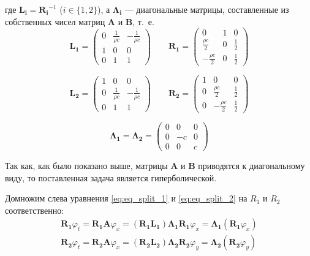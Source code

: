 \documentclass[12pt,a4paper]{article}
\begin{document}
где $\bm{L_i} = \bm{R_i}^{-1}$ ($i\in\{1,2\}$), а $\bm{\Lambda_i}$ --- диагональные матрицы, составленные из собственных чисел матриц $\bm{A}$ и $\bm{B}$, т.~е.
\begin{equation}
	\bm{L_1} = \begin{pmatrix}
				0 & \frac{1}{\rho c} & -\frac{1}{\rho c} \\
				1 & 0 & 0 \\
				0 & 1 & 1			
		 	 \end{pmatrix} \qquad
	\bm{R_1} = \begin{pmatrix}
				0 & 1 & 0 \\
				\frac{\rho c}{2} & 0 & \frac{1}{2} \\
				-\frac{\rho c}{2} & 0 & \frac{1}{2}		
		 	 \end{pmatrix}
\end{equation}

\begin{equation}
	\bm{L_2} = \begin{pmatrix}
				1 & 0 & 0 \\
				0 & \frac{1}{\rho c} & -\frac{1}{\rho c} \\
				0 & 1 & 1			
		 	 \end{pmatrix} \qquad
	\bm{R_2} = \begin{pmatrix}
				1 & 0 & 0 \\
				0 & \frac{\rho c}{2} & \frac{1}{2} \\
				0 & -\frac{\rho c}{2} & \frac{1}{2}		
		 	 \end{pmatrix}
\end{equation}

\begin{equation}
	\bm{\Lambda_1} = \bm{\Lambda_2} = \begin{pmatrix}
								0 & 0 & 0 \\
								0 & -c & 0 \\
								0 & 0 & c				
							\end{pmatrix}
\end{equation}

Так как, как было показано выше, матрицы $\bm{A}$ и $\bm{B}$ приводятся к диагональному виду, то поставленная задача является гиперболической.

Домножим слева уравнения \eqref{eq:eq_split_1} и \eqref{eq:eq_split_2} на $R_1$ и $R_2$ соответственно:
\begin{gather} 
	\bm{R_1}\varphi_t = \bm{R_1}\bm{A} \varphi_x = \left(\bm{R_1 L_1}\right)\bm{\Lambda_1 R_1} \varphi_x = \bm{\Lambda_1} \left(\bm{R_1} \varphi_x\right)\\
	\bm{R_2}\varphi_t = \bm{R_2}\bm{A} \varphi_x = \left(\bm{R_2  L_2}\right)\bm{\Lambda_2 R_2} \varphi_y = \bm{\Lambda_2} \left(\bm{R_2} \varphi_y\right)
\end{gather}
\end{document}
